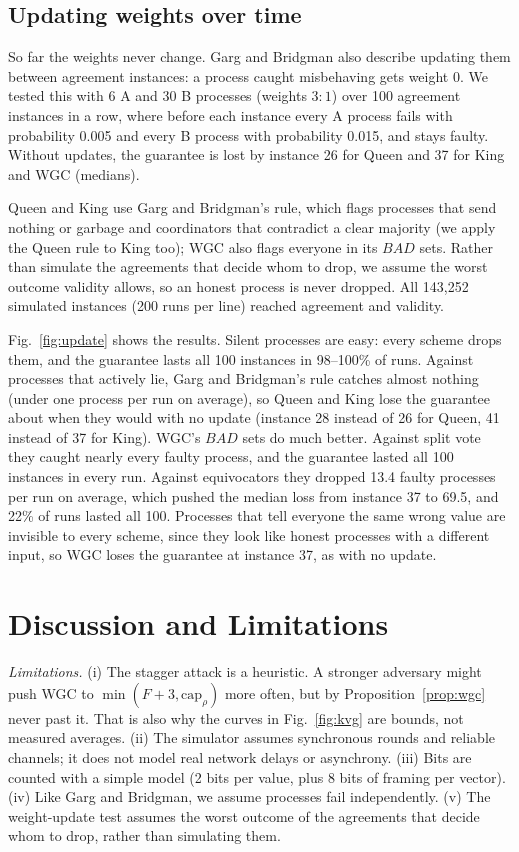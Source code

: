 \documentclass[conference]{IEEEtran}
\theoremstyle{definition}
\newcommand{\capr}{\mathrm{cap}_\rho}
\newcommand{\BAD}{\mathit{BAD}}
\begin{document}
\subsection{Updating weights over time}\label{sec:update}
So far the weights never change. Garg and Bridgman also describe updating them between agreement instances: a process caught misbehaving gets weight 0. We tested this with 6 A and 30 B processes (weights $3:1$) over 100 agreement instances in a row, where before each instance every A process fails with probability 0.005 and every B process with probability 0.015, and stays faulty. Without updates, the guarantee is lost by instance 26 for Queen and 37 for King and WGC (medians).

Queen and King use Garg and Bridgman's rule, which flags processes that send nothing or garbage and coordinators that contradict a clear majority (we apply the Queen rule to King too); WGC also flags everyone in its $\BAD$ sets. Rather than simulate the agreements that decide whom to drop, we assume the worst outcome validity allows, so an honest process is never dropped. All 143{,}252 simulated instances (200 runs per line) reached agreement and validity.

Fig.~\ref{fig:update} shows the results. Silent processes are easy: every scheme drops them, and the guarantee lasts all 100 instances in 98--100\% of runs. Against processes that actively lie, Garg and Bridgman's rule catches almost nothing (under one process per run on average), so Queen and King lose the guarantee about when they would with no update (instance 28 instead of 26 for Queen, 41 instead of 37 for King). WGC's $\BAD$ sets do much better. Against split vote they caught nearly every faulty process, and the guarantee lasted all 100 instances in every run. Against equivocators they dropped 13.4 faulty processes per run on average, which pushed the median loss from instance 37 to 69.5, and 22\% of runs lasted all 100. Processes that tell everyone the same wrong value are invisible to every scheme, since they look like honest processes with a different input, so WGC loses the guarantee at instance 37, as with no update.

\section{Discussion and Limitations}\label{sec:disc}

\emph{Limitations.} (i) The stagger attack is a heuristic. A stronger adversary might push WGC to $\min(F+3,\capr)$ more often, but by Proposition~\ref{prop:wgc} never past it. That is also why the curves in Fig.~\ref{fig:kvg} are bounds, not measured averages. (ii) The simulator assumes synchronous rounds and reliable channels; it does not model real network delays or asynchrony. (iii) Bits are counted with a simple model (2 bits per value, plus 8 bits of framing per vector). (iv) Like Garg and Bridgman, we assume processes fail independently. (v) The weight-update test assumes the worst outcome of the agreements that decide whom to drop, rather than simulating them.
\end{document}

